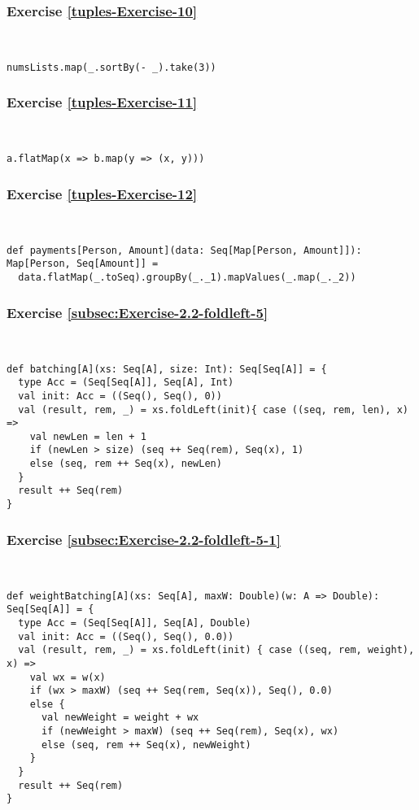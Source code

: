 
\subsubsection*{Exercise \ref{tuples-Exercise-10}}

~
\begin{lstlisting}
numsLists.map(_.sortBy(- _).take(3))
\end{lstlisting}


\subsubsection*{Exercise \ref{tuples-Exercise-11}}

~
\begin{lstlisting}
a.flatMap(x => b.map(y => (x, y)))
\end{lstlisting}


\subsubsection*{Exercise \ref{tuples-Exercise-12}}

~
\begin{lstlisting}
def payments[Person, Amount](data: Seq[Map[Person, Amount]]): Map[Person, Seq[Amount]] =
  data.flatMap(_.toSeq).groupBy(_._1).mapValues(_.map(_._2))
\end{lstlisting}


\subsubsection*{Exercise \ref{subsec:Exercise-2.2-foldleft-5}}

~
\begin{lstlisting}
def batching[A](xs: Seq[A], size: Int): Seq[Seq[A]] = {  
  type Acc = (Seq[Seq[A]], Seq[A], Int)
  val init: Acc = ((Seq(), Seq(), 0))
  val (result, rem, _) = xs.foldLeft(init){ case ((seq, rem, len), x) =>
    val newLen = len + 1
    if (newLen > size) (seq ++ Seq(rem), Seq(x), 1)
    else (seq, rem ++ Seq(x), newLen)
  }
  result ++ Seq(rem)
}
\end{lstlisting}


\subsubsection*{Exercise \ref{subsec:Exercise-2.2-foldleft-5-1}}

~
\begin{lstlisting}
def weightBatching[A](xs: Seq[A], maxW: Double)(w: A => Double): Seq[Seq[A]] = {  
  type Acc = (Seq[Seq[A]], Seq[A], Double)
  val init: Acc = ((Seq(), Seq(), 0.0))
  val (result, rem, _) = xs.foldLeft(init) { case ((seq, rem, weight), x) =>
    val wx = w(x)
    if (wx > maxW) (seq ++ Seq(rem, Seq(x)), Seq(), 0.0)
    else {
      val newWeight = weight + wx
      if (newWeight > maxW) (seq ++ Seq(rem), Seq(x), wx)
      else (seq, rem ++ Seq(x), newWeight)
    }
  }
  result ++ Seq(rem)
}
\end{lstlisting}


